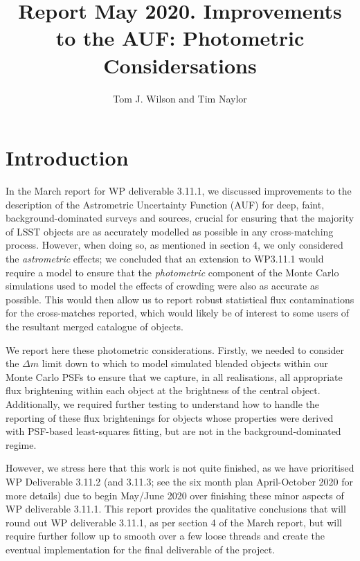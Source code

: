 \documentclass[fleqn,usenatbib]{mnras}
\title[]{Report May 2020. Improvements to the AUF: Photometric Considersations}
\author[Tom J. Wilson and Tim Naylor]{
Tom J. Wilson
and Tim Naylor
\\
}
\date{}
\begin{document}
\label{firstpage}
\pagerange{\pageref{firstpage}--\pageref{lastpage}}
\maketitle
\begin{abstract}


\end{abstract}

\section{Introduction}
In the March report for WP deliverable 3.11.1, we discussed improvements to the description of the Astrometric Uncertainty Function (AUF) for deep, faint, background-dominated surveys and sources, crucial for ensuring that the majority of LSST objects are as accurately modelled as possible in any cross-matching process.
However, when doing so, as mentioned in section 4, we only considered the \textit{astrometric} effects; we concluded that an extension to WP3.11.1 would require a model to ensure that the \textit{photometric} component of the Monte Carlo simulations used to model the effects of crowding were also as accurate as possible.
This would then allow us to report robust statistical flux contaminations for the cross-matches reported, which would likely be of interest to some users of the resultant merged catalogue of objects.

We report here these photometric considerations.
Firstly, we needed to consider the $\Delta m$ limit down to which to model simulated blended objects within our Monte Carlo PSFs to ensure that we capture, in all realisations, all appropriate flux brightening within each object at the brightness of the central object.
Additionally, we required further testing to understand how to handle the reporting of these flux brightenings for objects whose properties were derived with PSF-based least-squares fitting, but are not in the background-dominated regime.

However, we stress here that this work is not quite finished, as we have prioritised WP Deliverable 3.11.2 (and 3.11.3; see the six month plan April-October 2020 for more details) due to begin May/June 2020 over finishing these minor aspects of WP deliverable 3.11.1.
This report provides the qualitative conclusions that will round out WP deliverable 3.11.1, as per section 4 of the March report, but will require further follow up to smooth over a few loose threads and create the eventual implementation for the final deliverable of the project.
\end{document}
